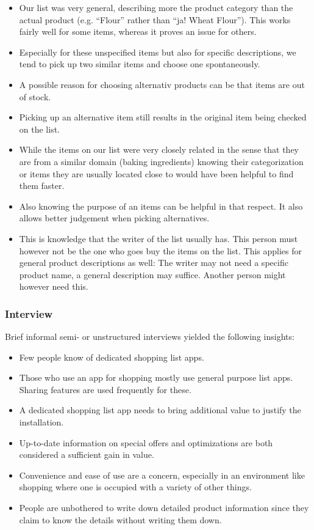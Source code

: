 \documentclass{scrartcl}
\begin{document}
      \begin{itemize}
        \item Our list was very general, describing more the product category than the actual product (e.g. ``Flour'' rather than ``ja! Wheat Flour''). 
          This works fairly well for some items, whereas it proves an issue for others.
        \item Especially for these unspecified items but also for specific descriptions, we tend to pick up two similar items and choose one spontaneously.
        \item A possible reason for choosing alternativ products can be that items are out of stock.
        \item Picking up an alternative item still results in the original item being checked on the list.
        \item While the items on our list were very closely related in the sense that they are from a similar domain (baking ingredients) knowing their categorization or items they are usually located close to would have been helpful to find them faster.
        \item Also knowing the purpose of an items can be helpful in that respect. It also allows better judgement when picking alternatives.
        \item This is knowledge that the writer of the list usually has. This person must however not be the one who goes buy the items on the list.
          This applies for general product descriptions as well: The writer may not need a specific product name, a general description may suffice. 
          Another person might however need this.
      \end{itemize}

    \subsubsection{Interview}
      Brief informal semi- or unstructured interviews yielded the following insights:
      \begin{itemize}
        \item Few people know of dedicated shopping list apps.
        \item Those who use an app for shopping mostly use general purpose list apps. Sharing features are used frequently for these.
        \item A dedicated shopping list app needs to bring additional value to justify the installation.
        \item Up-to-date information on special offers and optimizations are both considered a sufficient gain in value.
        \item Convenience and ease of use are a concern, especially in an environment like shopping where one is occupied with a variety of other things.
        \item People are unbothered to write down detailed product information since they claim to know the details without writing them down.
      \end{itemize}
\end{document}
